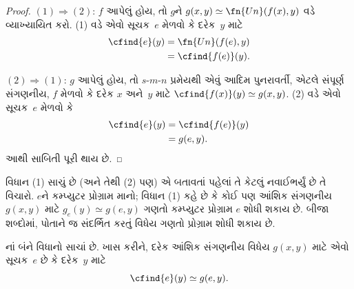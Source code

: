 \documentclass[../../../include/open-logic-section]{subfiles}
\begin{document}
\begin{proof}
$(1) \Rightarrow (2)$: $f$ આપેલું હોય, તો $g$ને
$g(x,y) \simeq \fn{Un}(f(x),y)$ વડે વ્યાખ્યાયિત કરો.
(1) વડે એવો સૂચક~$e$ મેળવો કે દરેક~$y$ માટે
\begin{align*}
\cfind{e}(y) & = \fn{Un}(f(e),y) \\
& = \cfind{f(e)}(y).
\end{align*}

$(2) \Rightarrow (1)$: $g$ આપેલું હોય, તો $s$-$m$-$n$
પ્રમેયથી એવું આદિમ પુનરાવર્તી, એટલે સંપૂર્ણ સંગણનીય, $f$ મેળવો
કે દરેક $x$ અને~$y$ માટે
$\cfind{f(x)}(y) \simeq g(x,y)$. (2) વડે એવો સૂચક~$e$
મેળવો કે
\begin{align*}
\cfind{e}(y) & = \cfind{f(e)}(y) \\
& = g(e,y).
\end{align*}
આથી સાબિતી પૂરી થાય છે.
\end{proof}

\begin{explain}
વિધાન (1) સાચું છે (અને તેથી (2) પણ) એ બતાવતાં પહેલાં
તે કેટલું નવાઈભર્યું છે તે વિચારો. $e$ને કમ્પ્યુટર પ્રોગ્રામ
માનો; વિધાન (1) કહે છે કે કોઈ પણ આંશિક સંગણનીય
$g(x,y)$ માટે $g_e(y) \simeq g(e,y)$ ગણતો કમ્પ્યુટર
પ્રોગ્રામ $e$ શોધી શકાય છે. બીજા શબ્દોમાં, પોતાને જ
સંદર્ભિત કરતું વિધેય ગણતો પ્રોગ્રામ શોધી શકાય છે.
\end{explain}

\begin{thm}
નાં બંને વિધાનો સાચાં છે. ખાસ
કરીને, દરેક આંશિક સંગણનીય વિધેય $g(x,y)$ માટે એવો
સૂચક~$e$ છે કે દરેક~$y$ માટે
\[
\cfind{e}(y) \simeq g(e,y).
\]
\end{thm}
\end{document}
